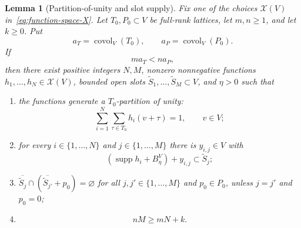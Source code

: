 \documentclass[11pt,reqno]{amsart}
\numberwithin{equation}{section}
\newtheorem{lemma}[theorem]{Lemma}
\theoremstyle{definition}
\theoremstyle{remark}
\newcommand{\covol}{\operatorname{covol}}
\newcommand{\supp}{\operatorname{supp}}
\begin{document}
\begin{lemma}[Partition-of-unity and slot supply]\label{lem:packet-slot-supply}
Fix one of the choices $\mathcal X(V)$ in~\eqref{eq:function-space-X}.
Let $T_0,P_0\subset V$ be full-rank lattices, let $m,n\ge1$, and let
$k\ge0$.  Put
\[
 a_T=\covol_V(T_0),
 \qquad
 a_P=\covol_V(P_0).
\]
If
\begin{equation}\label{eq:packet-slot-volume-gap}
 m a_T<n a_P,
\end{equation}
then there exist positive integers $N,M$, nonzero nonnegative functions
$h_1,\ldots,h_N\in\mathcal X(V)$, bounded open slots
$\widetilde S_1,\ldots,\widetilde S_M\subset V$, and $\eta>0$ such that
\begin{enumerate}[label=(\roman*)]
\item the functions generate a $T_0$-partition of unity:
\begin{equation}\label{eq:packet-slot-pou}
 \sum_{i=1}^N\sum_{\tau\in T_0}h_i(v+\tau)=1,
 \qquad v\in V;
\end{equation}
\item for every $i\in\{1,\ldots,N\}$ and
$j\in\{1,\ldots,M\}$ there is $y_{i,j}\in V$ with
\begin{equation}\label{eq:packet-fits-slot}
 (\supp h_i+B_\eta^V)+y_{i,j}\subset\widetilde S_j;
\end{equation}
\item $\overline{\widetilde S_j}\cap
(\overline{\widetilde S_{j'}}+p_0)=\varnothing$ for all
$j,j'\in\{1,\ldots,M\}$ and $p_0\in P_0$, unless
$j=j'$ and $p_0=0$;
\item
\begin{equation}\label{eq:packet-slot-surplus}
 nM\ge mN+k.
\end{equation}
\end{enumerate}
\end{lemma}
\end{document}
